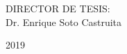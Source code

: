 \begin{titlepage}
\begin{minipage}[c][9.5cm][s]{11cm}
\begin{center}
    \vspace{2cm}

    {\small DIRECTOR DE TESIS:\\ Dr. Enrique Soto Castruita}

    \vspace{0.5cm}


    \vspace{1.5cm}

    2019

  \end{center}
\end{minipage}

\end{titlepage}
